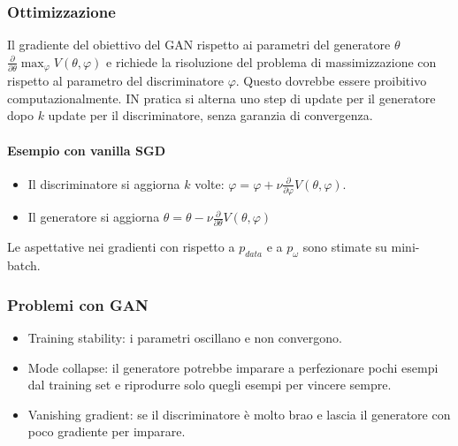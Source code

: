 		\subsubsection{Ottimizzazione}
		Il gradiente del obiettivo del GAN rispetto ai parametri del generatore $\theta$ $\frac{\partial}{\partial\theta}\max_\varphi V(\theta,\varphi)$ e richiede la risoluzione del problema di massimizzazione con rispetto al parametro del discriminatore $\varphi$.
		Questo dovrebbe essere proibitivo computazionalmente.
		IN pratica si alterna uno step di update per il generatore dopo $k$ update per il discriminatore, senza garanzia di convergenza.

			\paragraph{Esempio con vanilla SGD}
			\begin{multicols}{2}
				\begin{itemize}
					\item Il discriminatore si aggiorna $k$ volte: $\varphi = \varphi + \nu\frac{\partial}{\partial\varphi}V(\theta,\varphi)$.
					\item Il generatore si aggiorna $\theta = \theta-\nu\frac{\partial}{\partial\theta}V(\theta,\varphi)$
				\end{itemize}
			\end{multicols}
			Le aspettative nei gradienti con rispetto a $p_{data}$ e a $p_\omega$ sono stimate su mini-batch.

		\subsubsection{Problemi con GAN}
		\begin{itemize}
			\item Training stability: i parametri oscillano e non convergono.
			\item Mode collapse: il generatore potrebbe imparare a perfezionare pochi esempi dal training set e riprodurre solo quegli esempi per vincere sempre.
			\item Vanishing gradient: se il discriminatore \`e molto brao e lascia il generatore con poco gradiente per imparare.
		\end{itemize}

